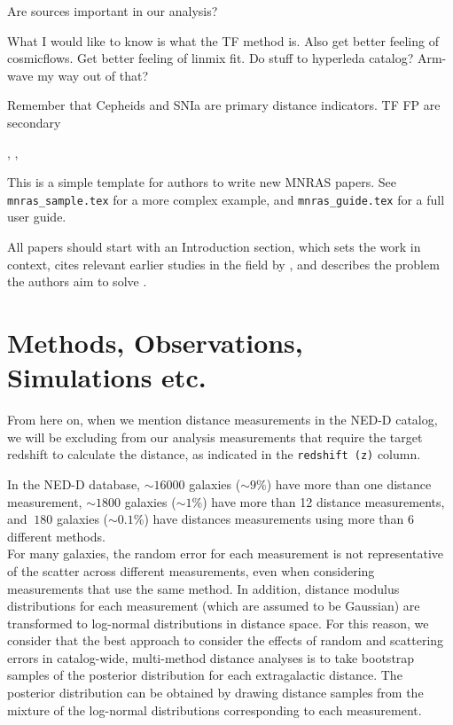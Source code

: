 \documentclass[a4paper,fleqn,usenatbib]{mnras}
\begin{document}
Are \citet{2mass} sources important in our analysis?

What I would like to know is what the TF method is. Also get better feeling of cosmicflows. Get better feeling of linmix fit. Do stuff to hyperleda catalog? Arm-wave my way out of that?

Remember that Cepheids and SNIa are primary distance indicators. TF FP are secondary 


\citet{tf07dist}



 \citet{chaparro18}, \citet{tecciencia}, \citet{gelmanppd} \citet{brooks} \citet{tforig}



This is a simple template for authors to write new MNRAS papers.
See \texttt{mnras\_sample.tex} for a more complex example, and \texttt{mnras\_guide.tex}
for a full user guide.

All papers should start with an Introduction section, which sets the work
in context, cites relevant earlier studies in the field by \citet{photred2},
and describes the problem the authors aim to solve \citep[e.g.][]{photred1}.

\section{Methods, Observations, Simulations etc.}

From here on, when we mention distance measurements in the NED-D catalog, we will be excluding from our analysis measurements that require the target redshift to calculate the distance, as indicated in the \texttt{redshift (z)} column.

In the NED-D database, $\sim16000$ galaxies ($\sim9$\%) have more than one distance measurement, $\sim1800$ galaxies ($\sim1$\%) have more than 12  distance measurements, and $~180$ galaxies ($\sim0.1$\%) have distances measurements using more than 6 different methods. \\

For many galaxies, the random error for each measurement is not representative of the scatter across different measurements, even when considering measurements that use the same method. In addition, distance modulus distributions for each measurement (which are assumed to be Gaussian) are transformed to log-normal distributions in distance space. For this reason, we consider that the best approach to consider the effects of random and scattering errors in catalog-wide, multi-method distance analyses is to take bootstrap samples of the posterior distribution for each extragalactic distance. The posterior distribution can be obtained by drawing distance samples from the mixture of the log-normal distributions corresponding to each measurement.\\
\end{document}
